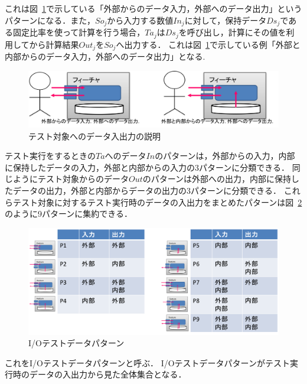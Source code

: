これは図~\ref{fig:D-3-Fig4}で示している「外部からのデータ入力，外部へのデータ出力」というパターンになる．また，$So_j$から入力する数値$In_j$に対して，保持データ$Ds_j$である固定比率を使って計算を行う場合，$Ta_j$は$Ds_j$を呼び出し，計算にその値を利用してから計算結果$Out_j$を$So_j$へ出力する．
これは図~\ref{fig:D-3-Fig4}で示している例「外部と内部からのデータ入力，外部へのデータ出力」となる.
\begin{figure}[htbp]
 \begin{center}
 \includegraphics[width=12cm]{./image/D-3-Fig4.png}
 \caption{テスト対象へのデータ入出力の説明}
 \label{fig:D-3-Fig4}
 \end{center}
\end{figure}

テスト実行をするときの$Ta$へのデータ$In$のパターンは，外部からの入力，内部に保持したデータの入力，外部と内部からの入力の3パターンに分類できる．
同じようにテスト対象からのデータ$Out$のパターンは外部への出力，内部に保持したデータの出力，外部と内部からデータの出力の3パターンに分類できる．
これらテスト対象に対するテスト実行時のデータの入出力をまとめたパターンは図~\ref{fig:D-4-Fig6}のように9パターンに集約できる．

\begin{figure}[htbp]
\begin{center}
\includegraphics[width=14cm]{./image/D-3-Fig5.png}
\caption{I/Oテストデータパターン}
\label{fig:D-4-Fig6}
\end{center}
\end{figure}

これをI/Oテストデータパターンと呼ぶ\cite{yumoto2015IPA}．
I/Oテストデータパターンがテスト実行時のデータの入出力から見た全体集合となる．

